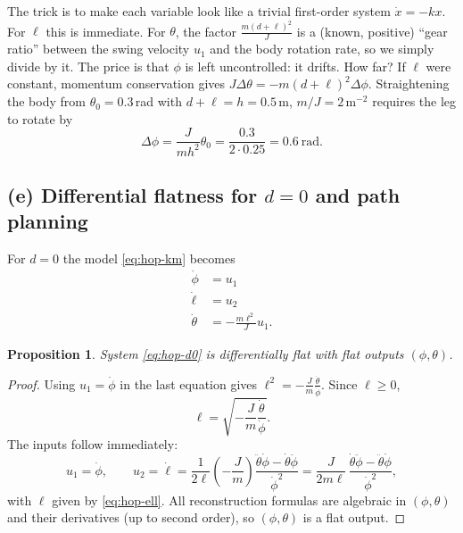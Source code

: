 \documentclass[11pt,a4paper]{article}
\theoremstyle{definition}
\theoremstyle{plain}
\newtheorem{proposition}[definition]{Proposition}
\theoremstyle{remark}
\begin{document}
\begin{intuition}
The trick is to make each variable look like a trivial first-order system $\dot x=-kx$. For $\ell$ this is immediate. For $\theta$, the factor $\frac{m(d+\ell)^2}{J}$ is a (known, positive) ``gear ratio'' between the swing velocity $u_1$ and the body rotation rate, so we simply divide by it. The price is that $\phi$ is left uncontrolled: it drifts. How far? If $\ell$ were constant, momentum conservation gives $J\Delta\theta=-m(d+\ell)^2\Delta\phi$. Straightening the body from $\theta_0=0.3$\,rad with $d+\ell=h=0.5$\,m, $m/J=2\,\mathrm{m^{-2}}$ requires the leg to rotate by
\[
  \Delta\phi=\frac{J}{m h^2}\theta_0=\frac{0.3}{2\cdot0.25}=0.6\ \text{rad}.
\]
\end{intuition}

\subsection{(e) Differential flatness for $d=0$ and path planning}

For $d=0$ the model \eqref{eq:hop-km} becomes
\begin{equation}
\begin{aligned}
  \dot\phi&=u_1\\ \dot\ell&=u_2\\ \dot\theta&=-\frac{m\ell^2}{J}u_1 .
\end{aligned}
\label{eq:hop-d0}
\end{equation}

\begin{proposition}
System \eqref{eq:hop-d0} is differentially flat with flat outputs $(\phi,\theta)$.
\end{proposition}

\begin{proof}
Using $u_1=\dot\phi$ in the last equation gives $\ell^2=-\frac{J}{m}\frac{\dot\theta}{\dot\phi}$. Since $\ell\ge0$,
\begin{equation}
  \ell=\sqrt{-\frac{J}{m}\frac{\dot\theta}{\dot\phi}} .
  \label{eq:hop-ell}
\end{equation}
The inputs follow immediately:
\begin{equation}
  u_1=\dot\phi,\qquad
  u_2=\dot\ell=\frac{1}{2\ell}\left(-\frac{J}{m}\right)\frac{\ddot\theta\dot\phi-\dot\theta\ddot\phi}{\dot\phi^2}
  =\frac{J}{2m\ell}\,\frac{\dot\theta\ddot\phi-\ddot\theta\dot\phi}{\dot\phi^2},
  \label{eq:hop-u2rec}
\end{equation}
with $\ell$ given by \eqref{eq:hop-ell}. All reconstruction formulas are algebraic in $(\phi,\theta)$ and their derivatives (up to second order), so $(\phi,\theta)$ is a flat output.
\end{proof}
\end{document}
